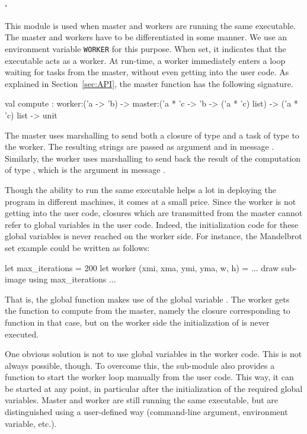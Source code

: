 \documentclass[a4paper,12pt]{article}
\begin{document}
\paragraph{.} This module is used when master and workers are
running the same executable. The master and workers have to be
differentiated in some manner. We use an environment variable
\texttt{WORKER} for this purpose. When set, it indicates that the
executable acts as a worker. At run-time, a worker immediately 
enters a loop waiting for tasks from the master, without even getting
into the user code. 
As explained in Section~\ref{sec:API}, 
the master function has the following signature.
\begin{ocaml}
 val compute : 
      worker:('a -> 'b) -> 
      master:('a * 'c -> 'b -> ('a * 'c) list) -> ('a * 'c) list -> unit  
\end{ocaml}
The master uses marshalling to send both a closure of type 
 and a task of type  to the worker. The resulting strings
are passed as argument  and  in message
. Similarly, the worker uses marshalling to send back the
result of the computation of type , which is the argument
 in message .

Though the ability to run the same executable helps a lot in deploying
the program in different machines, it comes at a small price. Since
the worker is not getting into the user code, closures which are
transmitted from the master cannot refer to global variables in the
user code. Indeed, the initialization code for these global variables
is never reached on the worker side. For instance, the Mandelbrot set
example could be written as follows:
\begin{ocaml}
  let max_iterations = 200
  let worker (xmi, xma, ymi, yma, w, h) =
    ... draw sub-image using max_iterations ...
\end{ocaml}
That is, the global function  makes use of the global
variable . The worker gets the function to compute
from the master, namely the closure corresponding to function
 in that case, but on the worker side the initialization of
 is never executed.

One obvious solution is  not to use global variables in the
worker code. This is not always possible, though. 
To overcome this, the  sub-module also provides a
 function to start the worker loop manually from
the user code. This way, it can be started at any point, in particular
after the initialization of the required global variables.
Master and worker are still running the same executable, but are 
distinguished using a user-defined way (command-line argument,
environment variable, etc.).
\end{document}
